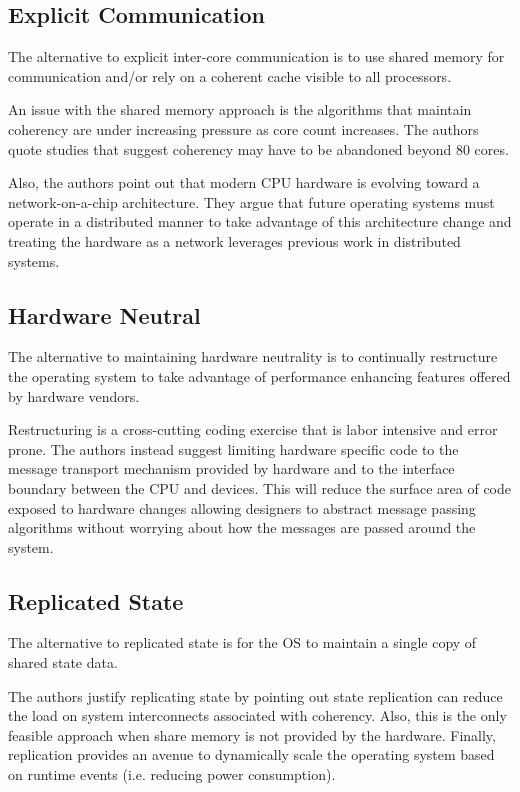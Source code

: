 \documentclass[12pt]{article}
\begin{document}
\subsection{Explicit Communication}
The alternative to explicit inter-core communication is to use shared
memory for communication and/or rely on a coherent cache visible to
all processors.

An issue with the shared memory approach is the algorithms that
maintain coherency are under increasing pressure as core count
increases.  The authors quote studies that suggest coherency may have
to be abandoned beyond 80 cores.

Also, the authors point out that modern CPU hardware is evolving
toward a network-on-a-chip architecture.  They argue that future
operating systems must operate in a distributed manner to take
advantage of this architecture change and treating the hardware as
a network leverages previous work in distributed systems.


\subsection{Hardware Neutral}
The alternative to maintaining hardware neutrality is to continually
restructure the operating system to take advantage of performance
enhancing features offered by hardware vendors.

Restructuring is a cross-cutting coding exercise that is labor
intensive and error prone.  The authors instead suggest limiting
hardware specific code to the message transport mechanism provided by
hardware and to the interface boundary between the CPU and devices.
This will reduce the surface area of code exposed to hardware changes
allowing designers to abstract message passing algorithms without
worrying about how the messages are passed around the system.

\subsection{Replicated State}
The alternative to replicated state is for the OS to maintain a single
copy of shared state data.

The authors justify replicating state by pointing out state
replication can reduce the load on system interconnects associated
with coherency.  Also, this is the only feasible approach when share
memory is not provided by the hardware.  Finally, replication provides
an avenue to dynamically scale the operating system based on runtime
events (i.e. reducing power consumption).
\end{document}
